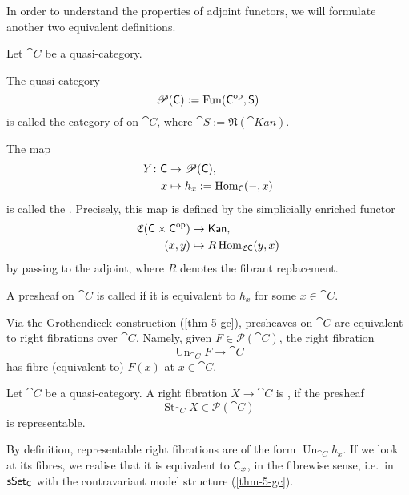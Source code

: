 In order to understand the properties of adjoint functors,
we will formulate another two equivalent definitions.

\begin{definition}
    Let $\cat C$ be a quasi-category.
    
    \begin{itms}
        \item The quasi-category 
        \[ \mathscr P(\textup{\textsf{C}}):=\operatorname{Fun}(\textup{\textsf{C}}^{\mathrm{op}},\textup{\textsf{S}}) \]
        is called the category of  on $\cat C$,
        where $\cat S:=\mathfrak N(\cat{Kan})$.
    
        \item The map
        \[\begin{aligned}
            Y\colon\textup{\textsf{C}}&\to\mathscr P(\textup{\textsf{C}}),\\
            x&\mapsto h_x:=\operatorname{Hom}_{\textup{\textsf{C}}}(-,x)
        \end{aligned}\]
        is called the .
        Precisely, this map is defined by the simplicially enriched functor 
        \[\begin{aligned}
            \mathfrak C(\textup{\textsf{C}}\times\textup{\textsf{C}}^{\mathrm{op}})&\to\textup{\textsf{Kan}},\\
            (x,y)&\mapsto R\operatorname{Hom}_{\mathfrak C\textup{\textsf{C}}}(y,x)
        \end{aligned}\]
        by passing to the adjoint,
        where $R$ denotes the fibrant replacement.
    
        \item A presheaf on $\cat C$ is called  if 
        it is equivalent to $h_x$ for some $x\in\cat C$.
    \end{itms}
\end{definition}

Via the Grothendieck construction (\ref{thm-5-gc}),
presheaves on $\cat C$ are equivalent to right fibrations over $\cat C$.
Namely, given $F\in\mathscr P(\cat C)$, the right fibration 
\[ \operatorname{Un}_{\cat C}F\to\cat C \]
has fibre (equivalent to) $F(x)$ at $x\in\cat C$.

\begin{definition}
    Let $\cat C$ be a quasi-category.
    A right fibration $X\to\cat C$ is , 
    if the presheaf 
    \[ \operatorname{St}_{\cat C}X\in\mathscr P(\cat C) \]
    is representable.
\end{definition}

By definition, representable right fibrations are of the form
$\operatorname{Un}_{\cat{C}}h_x$.
If we look at its fibres, we realise that it is equivalent to $\textup{\textsf{C}}_{\/x}$,
in the fibrewise sense, i.e.\ in $\textup{\textsf{sSet}}_{\/\textup{\textsf{C}}}$
with the contravariant model structure (\ref{thm-5-gc}).

